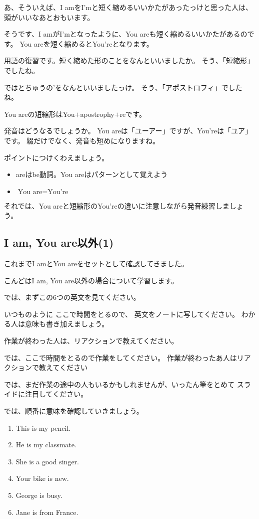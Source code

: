 \documentclass[book,jafontscale=0.9247]{jlreq}
\newcommand{\mySagyo}{%
\par%
\bigskip
では、ここで時間をとるので作業をしてください。
作業が終わったあ人はリアクションで教えてください\par%
\begin{minipage}[t]{.98\textwidth}
\mbox{}\hrulefill\mbox{}\par%
\mbox{}\hfill{}\raisebox{-.5\height}{作業}\hfill\mbox{}\par%
\mbox{}\hrulefill\mbox{}
\end{minipage}%
\par%
\bigskip%
では、まだ作業の途中の人もいるかもしれませんが、いったん筆をとめて
スライドに注目してください。%
\par%
\bigskip
}
\begin{document}
あ、そういえば、I amをI'mと短く縮めるいいかたがあったっけと思った人は、
頭がいいなあとおもいます。

そうです、I amがI'mとなったように、You areも短く縮めるいいかたがあるのです。
You areを短く縮めるとYou'reとなります。

用語の復習です。短く縮めた形のことをなんといいましたか。
そう、「短縮形」でしたね。

ではとちゅうの'をなんといいましたっけ。
そう、「ア{\gtfamily ポ}ストロフィ」でしたね。

You areの短縮形はYou$+$apostrophy$+$reです。

発音はどうなるでしょうか。
You areは「ユーアー」ですが、You'reは「ユア」です。
綴だけでなく、発音も短めになりますね。


ポイントにつけくわえましょう。

\begin{itemize}
 \item areはbe動詞。You areはパターンとして覚えよう
 \item {\gtfamily $\text{You are}=\text{You're}$}
\end{itemize}

それでは、You areと短縮形のYou'reの違いに注意しながら発音練習しましょう。
\newpage

\subsection{I am, You are以外(1)}
{\large \ComputerMouse}
これまでI amとYou areをセットとして確認してきました。

こんどはI am, You are以外の場合について学習します。


では、まずこの6つの英文を見てください。

いつものように
ここで時間をとるので、
英文をノートに写してください。
わかる人は意味も書き加えましょう。

作業が終わった人は、リアクションで教えてください。

\mySagyo

では、順番に意味を確認していきましょう。


\begin{enumerate}
 \item This is my pencil.
 \item He is my classmate.
 \item She is a good singer.
 \item Your bike is new.
 \item George is busy.
 \item Jane is from France.
\end{enumerate}
\end{document}
